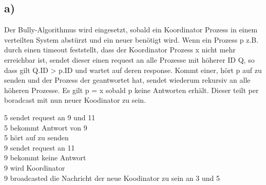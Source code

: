 \documentclass[ngerman]{fbi-aufgabenblatt}
\begin{document}
	\subsection*{a)}
	Der Bully-Algorithmus wird eingesetzt, sobald ein Koordinator Prozess in einem verteilten System abstürzt und ein neuer benötigt wird.
	Wenn ein Prozess p z.B. durch einen timeout feststellt, dass der Koordinator Prozess x nicht mehr erreichbar ist, sendet dieser einen request an alle Prozesse mit höherer ID Q, so dass gilt Q.ID > p.ID und wartet auf deren response. Kommt einer, hört p auf zu senden und der Prozess der geantwortet hat, sendet wiederum rekursiv an alle höheren Prozesse. Es gilt p = x sobald p keine Antworten erhält. Dieser teilt per boradcast mit nun neuer Koodinator zu sein.

	5 sendet request an 9 und 11\\
	5 bekommt Antwort von 9\\
	5 hört auf zu senden\\
	9 sendet request an 11\\
	9 bekommt keine Antwort\\
	9 wird Koordinator\\
	9 broadcasted die Nachricht der neue Koodinator zu sein an 3 und 5 	
		
	
\end{document}
